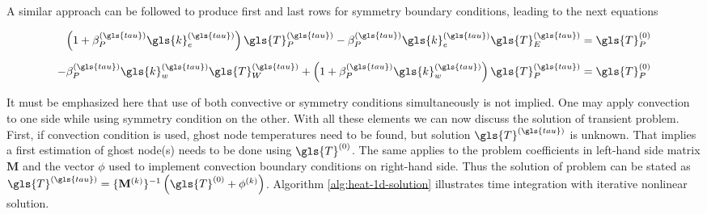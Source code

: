 \documentclass[12pt]{article}%
\begin{document}
A similar approach can be followed to produce first and last rows for symmetry boundary conditions, leading to the next equations

\begin{align}
\left(
1 + \beta_{P}^{(\gls{tau})}\gls{k}_{e}^{(\gls{tau})}
\right)\gls{T}_{P}^{(\gls{tau})}
-\beta_{P}^{(\gls{tau})}\gls{k}_{e}^{(\gls{tau})}\gls{T}_{E}^{(\gls{tau})}
&= \gls{T}^{(0)}_{P}
\\[6pt]
-\beta_{P}^{(\gls{tau})}\gls{k}_{w}^{(\gls{tau})}\gls{T}_{W}^{(\gls{tau})}
+ \left(
1 + \beta_{P}^{(\gls{tau})}\gls{k}_{w}^{(\gls{tau})}
\right)\gls{T}_{P}^{(\gls{tau})}
&= \gls{T}^{(0)}_{P}
\end{align}

It must be emphasized here that use of both convective or symmetry conditions simultaneously is not implied. One may apply convection to one side while using symmetry condition on the other. With all these elements we can now discuss the solution of transient problem. First, if convection condition is used, ghost node temperatures need to be found, but solution $\gls{T}^{(\gls{tau})}$ is unknown. That implies a first estimation of ghost node(s) needs to be done using $\gls{T}^{(0)}$. The same applies to the problem coefficients in left-hand side matrix $\mathbf{M}$ and the vector $\phi$ used to implement convection boundary conditions on right-hand side. Thus the solution of problem can be stated as $\gls{T}^{(\gls{tau})}=\{\mathbf{M}^{(k)}\}^{-1}\left(\gls{T}^{(0)} + \phi^{(k)}\right)$. Algorithm \ref{alg:heat-1d-solution} illustrates time integration with iterative nonlinear solution.
\end{document}
